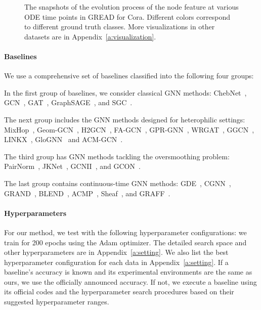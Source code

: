 \documentclass{article}
\theoremstyle{plain}
\theoremstyle{definition}
\theoremstyle{remark}
\begin{document}
\begin{figure}[t]
    \centering
    \caption{The snapshots of the evolution process of the node feature at various ODE time points in GREAD for Cora. Different colors correspond to different ground truth classes. More visualizations in other datasets are in Appendix~\ref{a:visualization}.}
    \label{fig:cora_tsne}
\end{figure}

\paragraph{Baselines} We use a comprehensive set of baselines classified into the following four groups:
\begin{compactenum}
    \item In the first group of baselines, we consider classical GNN methods: ChebNet~\cite{defferrard2016chebnet}, GCN~\cite{kipf2017GCN}, GAT~\cite{velickovic2018GAT}, GraphSAGE~\cite{hamilton2017graphSAGE}, and SGC~\cite{Wu2019SGC}.
    \item The next group includes the GNN methods designed for heterophilic settings: MixHop~\cite{abu2019mixhop}, Geom-GCN~\cite{pei2020geomGCN}, H2GCN~\cite{zhu2020h2gcn}, FA-GCN~\cite{Bo2021fagcn}, GPR-GNN~\cite{chien2021GPRGNN}, WRGAT~\cite{suresh2021WRGAT}, GGCN~\cite{yan2021GGCN}, LINKX~\cite{lim2022LINKX}, GloGNN~\cite{li2022GloGNN} and ACM-GCN~\cite{luan2022ACMGCN}.
    \item The third group has GNN methods tackling the oversmoothing problem: PairNorm~\cite{zhao2020pairnorm}, JKNet~\cite{xu2018jknet}, GCNII~\cite{chen2020gcnii}, and GCON~\cite{rusch2022gcon}.
    \item The last group contains continuous-time GNN methods: GDE~\cite{poli2019gde}, CGNN~\cite{xhonneux2019CGNN}, GRAND~\cite{chamberlain2021grand}, BLEND~\cite{chamberlain2021blend}, ACMP~\cite{wang2023acmp}, Sheaf~\cite{bodnar2022Sheaf}, and GRAFF~\cite{giovanni2022GRAFF}.
\end{compactenum}

\paragraph{Hyperparameters} For our method, we test with the following hyperparameter configurations: we train for 200 epochs using the Adam optimizer. The detailed search space and other hyperparameters are in Appendix~\ref{a:setting}. We also list the best hyperparameter configuration for each data in Appendix~\ref{a:setting}. If a baseline's accuracy is known and its experimental environments are the same as ours, we use the officially announced accuracy. If not, we execute a baseline using its official codes and the hyperparameter search procedures based on their suggested hyperparameter ranges.
\end{document}
